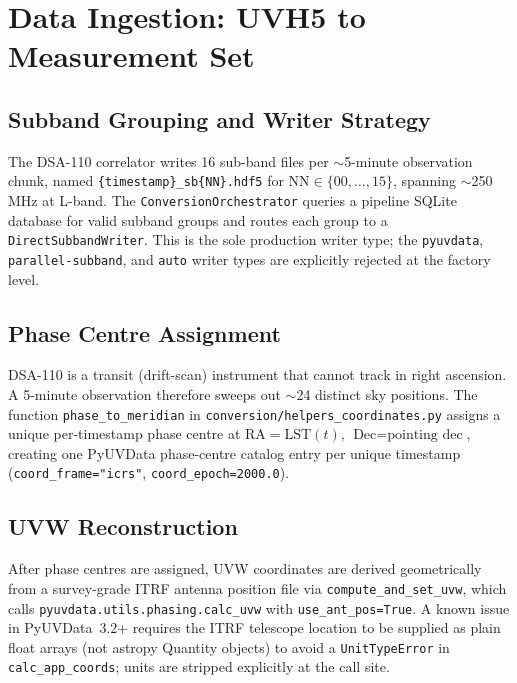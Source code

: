 \documentclass[12pt,a4paper]{article}
\begin{document}
\section{Data Ingestion: UVH5 to Measurement Set}

\subsection{Subband Grouping and Writer Strategy}

The DSA-110 correlator writes 16 sub-band files per $\sim$5-minute
observation chunk, named \texttt{\{timestamp\}\_sb\{NN\}.hdf5} for
$\text{NN} \in \{00,\ldots,15\}$, spanning $\sim$250\,MHz at L-band.
The \texttt{ConversionOrchestrator} queries a pipeline SQLite database for
valid subband groups and routes each group to a \texttt{DirectSubbandWriter}.
This is the sole production writer type; the \texttt{pyuvdata},
\texttt{parallel-subband}, and \texttt{auto} writer types are explicitly
rejected at the factory level.

\subsection{Phase Centre Assignment}

DSA-110 is a transit (drift-scan) instrument that cannot track in right
ascension.  A 5-minute observation therefore sweeps out $\sim$24 distinct
sky positions.  The function \texttt{phase\_to\_meridian} in
\texttt{conversion/helpers\_coordinates.py} assigns a unique per-timestamp
phase centre at $\text{RA} = \text{LST}(t)$, $\text{Dec} = \text{pointing dec}$,
creating one PyUVData phase-centre catalog entry per unique timestamp
(\texttt{coord\_frame="icrs"}, \texttt{coord\_epoch=2000.0}).

\subsection{UVW Reconstruction}

After phase centres are assigned, UVW coordinates are derived geometrically
from a survey-grade ITRF antenna position file via
\texttt{compute\_and\_set\_uvw}, which calls
\texttt{pyuvdata.utils.phasing.calc\_uvw} with \texttt{use\_ant\_pos=True}.
A known issue in PyUVData~3.2+ requires the ITRF telescope location to be
supplied as plain float arrays (not astropy Quantity objects) to avoid a
\texttt{UnitTypeError} in \texttt{calc\_app\_coords}; units are stripped
explicitly at the call site.
\end{document}
